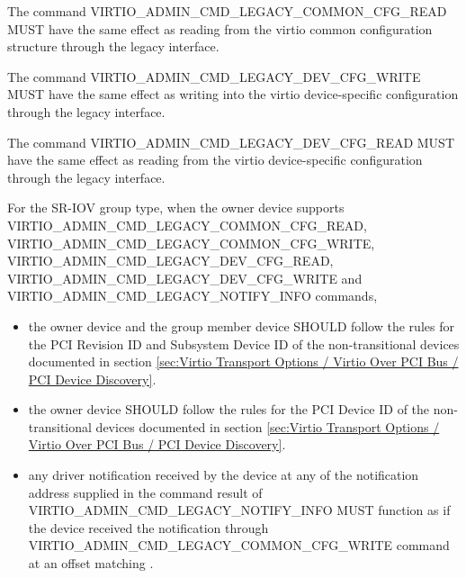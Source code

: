 The command VIRTIO_ADMIN_CMD_LEGACY_COMMON_CFG_READ MUST have the same effect as
reading from the virtio common configuration structure through the legacy
interface.

The command VIRTIO_ADMIN_CMD_LEGACY_DEV_CFG_WRITE MUST have the same effect as
writing into the virtio device-specific configuration through the legacy
interface.

The command VIRTIO_ADMIN_CMD_LEGACY_DEV_CFG_READ MUST have the same effect as
reading from the virtio device-specific configuration through the legacy
interface.

For the SR-IOV group type, when the owner device supports
VIRTIO_ADMIN_CMD_LEGACY_COMMON_CFG_READ,
VIRTIO_ADMIN_CMD_LEGACY_COMMON_CFG_WRITE, VIRTIO_ADMIN_CMD_LEGACY_DEV_CFG_READ,
VIRTIO_ADMIN_CMD_LEGACY_DEV_CFG_WRITE and VIRTIO_ADMIN_CMD_LEGACY_NOTIFY_INFO
commands,
\begin{itemize}
\item the owner device and the group member device SHOULD follow the rules
for the PCI Revision ID and Subsystem Device ID of the non-transitional devices
documented in section \ref{sec:Virtio Transport Options / Virtio Over PCI Bus / PCI Device Discovery}.

\item the owner device SHOULD follow the rules for the PCI Device ID of the non-transitional
devices documented in section
\ref{sec:Virtio Transport Options / Virtio Over PCI Bus / PCI Device Discovery}.

\item any driver notification received by the device at any of the notification
address supplied in the command result of
VIRTIO_ADMIN_CMD_LEGACY_NOTIFY_INFO MUST function as if the device received
the notification through VIRTIO_ADMIN_CMD_LEGACY_COMMON_CFG_WRITE
command at an offset  matching .
\end{itemize}

